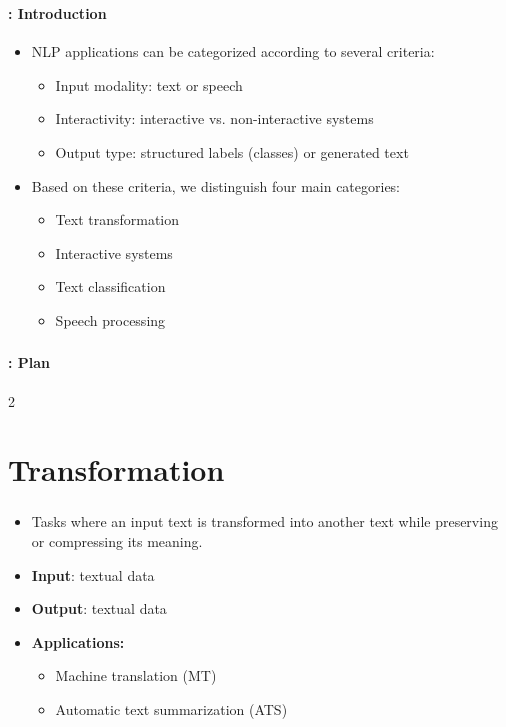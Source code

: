 \documentclass[xcolor=table]{beamer}
\subtitle[11- Some applications]{Chapter 11\\Some applications}
\begin{document}
\begin{frame}
	\frametitle{\inserttitle}
	\framesubtitle{\insertshortsubtitle: Introduction}
	
	\begin{itemize}
		\item NLP applications can be categorized according to several criteria:
		\begin{itemize}
			\item Input modality: text or speech
			\item Interactivity: interactive vs. non-interactive systems
			\item Output type: structured labels (classes) or generated text
		\end{itemize}
		\item Based on these criteria, we distinguish four main categories:
		\begin{itemize}
			\item Text transformation
			\item Interactive systems
			\item Text classification
			\item Speech processing
		\end{itemize}
	\end{itemize}
	
\end{frame}


\begin{frame}
	\frametitle{\inserttitle}
	\framesubtitle{\insertshortsubtitle: Plan}

	\begin{multicols}{2}
	\tableofcontents
	\end{multicols}

\end{frame}

\section{Transformation}

\begin{frame}
	\frametitle{\insertshortsubtitle}
	\framesubtitle{\insertsection}
	
	\begin{itemize}
		\item Tasks where an input text is transformed into another text while preserving or compressing its meaning.
		\item \textbf{Input}: textual data
		\item \textbf{Output}: textual data
		\item \textbf{Applications:}
		\begin{itemize}
			\item Machine translation (MT)
			\item Automatic text summarization (ATS)
		\end{itemize}
	\end{itemize}

\end{frame}
\end{document}
